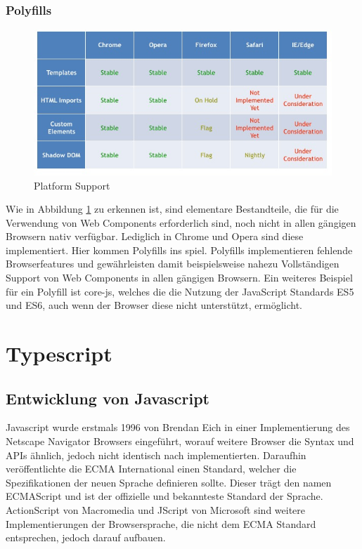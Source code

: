 \subsubsection{Polyfills}
\begin{figure}[htp]
 \centering
 \includegraphics[width=0.8\linewidth]{kapitel2/platform_support.jpg}
 \caption{Platform Support \cite{WebCo43:online}}
 \label{fig:platform_support}
\end{figure}

\noindent Wie in Abbildung \ref{fig:platform_support} zu erkennen ist, sind elementare Bestandteile, die für die Verwendung von Web Components erforderlich sind, noch nicht in
allen gängigen Browsern nativ verfügbar. Lediglich in Chrome und Opera sind diese implementiert.
Hier kommen Polyfills ins spiel. Polyfills implementieren fehlende Browserfeatures und gewährleisten damit beispielsweise nahezu Vollständigen
Support von Web Components in allen gängigen Browsern. Ein weiteres Beispiel für ein Polyfill ist core-js,
welches die die Nutzung der JavaScript Standards ES5 und ES6, auch wenn der Browser diese nicht unterstützt, ermöglicht.



\section{Typescript}

\subsection{Entwicklung von Javascript}


Javascript wurde erstmals 1996 von Brendan Eich in einer Implementierung des Netscape Navigator Browsers eingeführt,
worauf weitere Browser die Syntax und APIs ähnlich, jedoch nicht identisch nach implementierten.
Daraufhin veröffentlichte die ECMA International einen Standard, welcher die Spezifikationen der neuen Sprache
definieren sollte. Dieser trägt den namen ECMAScript und ist der offizielle und bekannteste Standard der
Sprache. ActionScript von Macromedia und JScript von Microsoft sind weitere Implementierungen der Browsersprache,
die nicht dem ECMA Standard entsprechen, jedoch darauf aufbauen.

